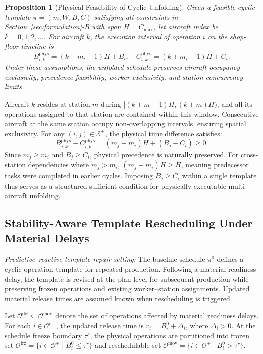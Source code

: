 \documentclass[journal,10pt]{IEEEtran}
\newtheorem{proposition}{Proposition}
\begin{document}
\begin{proposition}[Physical Feasibility of Cyclic Unfolding]
Given a feasible cyclic template $\pi = (m, W, B, C)$ satisfying all constraints in Section~\ref{sec:formulation}-B with span $H = C_{\max}$, let aircraft index be $k = 0, 1, 2, \dots$. For aircraft $k$, the execution interval of operation $i$ on the shop-floor timeline is
\begin{equation}
B_{i,k}^{\mathrm{phys}} = (k+m_i-1)H + B_i, \quad C_{i,k}^{\mathrm{phys}} = (k+m_i-1)H + C_i.
\end{equation}
Under these assumptions, the unfolded schedule preserves aircraft occupancy exclusivity, precedence feasibility, worker exclusivity, and station concurrency limits.
\end{proposition}
\begin{IEEEproof}
Aircraft $k$ resides at station $m$ during $[(k+m-1)H, (k+m)H)$, and all its operations assigned to that station are contained within this window. Consecutive aircraft at the same station occupy non-overlapping intervals, ensuring spatial exclusivity. For any $(i,j)\in\mathcal{E}^+$, the physical time difference satisfies:
\begin{equation}
B_{j,k}^{\mathrm{phys}} - C_{i,k}^{\mathrm{phys}} = (m_j - m_i)H + (B_j - C_i) \ge 0.
\end{equation}
Since $m_j\ge m_i$ and $B_j\ge C_i$, physical precedence is naturally preserved. For cross-station dependencies where $m_j>m_i$, $(m_j-m_i)H\ge H$, meaning predecessor tasks were completed in earlier cycles. Imposing $B_j\ge C_i$ within a single template thus serves as a structured sufficient condition for physically executable multi-aircraft unfolding.
\end{IEEEproof}

\subsection{Stability-Aware Template Rescheduling Under Material Delays}

\textit{Predictive--reactive template repair setting:}
The baseline schedule $\pi^0$ defines a cyclic operation template for repeated production. Following a material readiness delay, the template is revised at the plan level for subsequent production while preserving frozen operations and existing worker--station assignments. Updated material release times are assumed known when rescheduling is triggered.

Let $\mathcal{O}^{\mathrm{del}}\subseteq\mathcal{O}^{\mathrm{mov}}$ denote the set of operations affected by material readiness delays. For each $i\in\mathcal{O}^{\mathrm{del}}$, the updated release time is $r_i=B_i^0+\Delta_i$, where $\Delta_i>0$. At the schedule freeze boundary $\tau^r$, the physical operations are partitioned into frozen set $\mathcal{O}^{\mathrm{frz}}=\{i\in\mathcal{O}^{+}\mid B_i^0\le\tau^r\}$ and reschedulable set $\mathcal{O}^{\mathrm{mov}}=\{i\in\mathcal{O}^{+}\mid B_i^0>\tau^r\}$.
\end{document}
